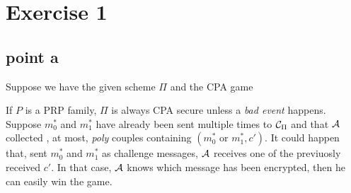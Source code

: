 \chapter*{Exercise 1}
\section{point a}
Suppose we have the given scheme $\Pi$ and the CPA game

\begin{figure}[h!]
   \centering
   \sdinit{}
\end{figure}


If $P$ is a PRP family, $\Pi$ is always CPA secure unless a \textit{bad event }
happens.\\

Suppose $m^{*}_{0}$ and $m^{*}_{1}$ have already been sent multiple times to
$\mathcal{C}_{\Pi}$ and that $\mathcal{A}$ collected , at most, \textit{poly} couples containing
$(m^{*}_{0} \text{ or } m^{*}_{1}, c' )$. It could happen that, sent  $m^{*}_{0}$ and
$m^{*}_{1}$ as challenge messages, $\mathcal{A}$ receives one of the previuosly received
$c'$. In that case, $\mathcal{A}$ knows which message has been encrypted, then he can
easily win the game.\\

